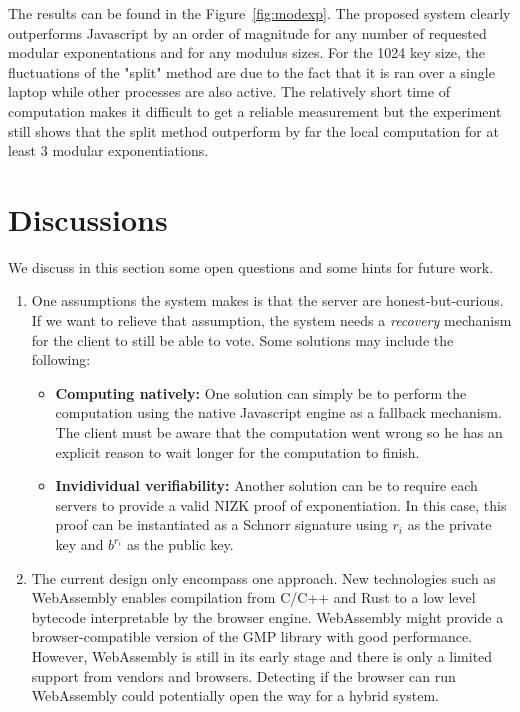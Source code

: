 \documentclass[]{article}
\begin{document}
The results can be found in the Figure~\ref{fig:modexp}. The proposed system
clearly outperforms Javascript by an order of magnitude for any number of
requested modular exponentations and for any modulus sizes. For the 1024 key
size, the fluctuations of the "split" method are due to the fact that it is ran
over a single laptop while other processes are also active. The relatively short
time of computation makes it difficult to get a reliable measurement but the
experiment still shows that the split method outperform by far the local
computation for at least 3 modular exponentiations.

\section{Discussions} \label{discussions}

We discuss in this section some open questions and some hints for future work. 

\begin{enumerate} 
    \item One assumptions the system makes is that the server are
        honest-but-curious. If we want to relieve that assumption, the system
        needs a \textit{recovery} mechanism for the client to still be able to
        vote.  Some solutions may include the following: 
        \begin{itemize} 
            \item \textbf{Computing natively:} One solution can simply be to
                perform the computation using the native Javascript engine as a
                fallback mechanism. The client must be aware that the
                computation went wrong so he has an explicit reason to wait
                longer for the computation to finish.  
            \item \textbf{Invidividual verifiability:} Another solution can be
                to require each servers to provide a valid NIZK proof of
                exponentiation. In this case, this proof can be instantiated as
                a Schnorr signature using $r_i$ as the private key and $b^{r_i}$
                as the public key.  
        \end{itemize} 
    \item The current design only encompass one approach. New technologies such
        as WebAssembly \cite{wasm} enables compilation from C/C++ and Rust to a
        low level bytecode interpretable by the browser engine. WebAssembly
        might provide a browser-compatible version of the GMP library with good
        performance. However, WebAssembly is still in its early stage and there
        is only a limited support from vendors and browsers. Detecting if the
        browser can run WebAssembly could potentially open the way for a hybrid
        system.
\end{enumerate}
\end{document}
